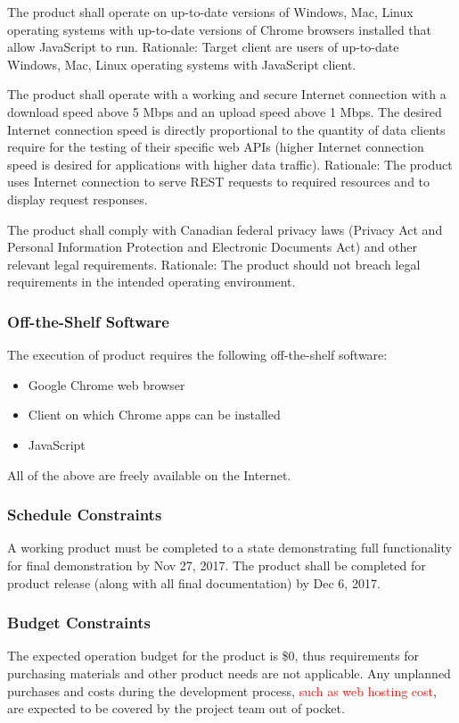 \documentclass[12pt, titlepage]{article}
\begin{document}
The product shall operate on up-to-date versions of Windows, Mac, Linux operating systems with up-to-date versions of Chrome browsers installed that allow JavaScript to run. Rationale: Target client are users of up-to-date Windows, Mac, Linux operating systems with JavaScript client. 

The product shall operate with a working and secure Internet connection with a download speed above 5 Mbps and an upload speed above 1 Mbps. The desired Internet connection speed is directly proportional to the quantity of data clients require for the testing of their specific web APIs (higher Internet connection speed is desired for applications with higher data traffic).
Rationale: The product uses Internet connection to serve REST requests to required resources and to display request responses.

The product shall comply with Canadian federal privacy laws (Privacy Act and Personal Information Protection and Electronic Documents Act) and other relevant legal requirements. Rationale: The product should not breach legal requirements in the intended operating environment.


\subsubsection{Off-the-Shelf Software}
The execution of product requires the following off-the-shelf software:
\begin{itemize}
	\item Google Chrome web browser
	\item Client on which Chrome apps can be installed  
	\item JavaScript
\end{itemize}
All of the above are freely available on the Internet.

\subsubsection{Schedule Constraints}
A working product must be completed to a state demonstrating full functionality for final demonstration by Nov 27, 2017. The product shall be completed for product release (along with all final documentation) by Dec 6, 2017.

\subsubsection{Budget Constraints}
The expected operation budget for the product is \$0, thus requirements for purchasing materials and other product needs are not applicable. Any unplanned purchases and costs during the development process, \textcolor{red}{such as web hosting cost}, are expected to be covered by the project team out of pocket.
\end{document}
